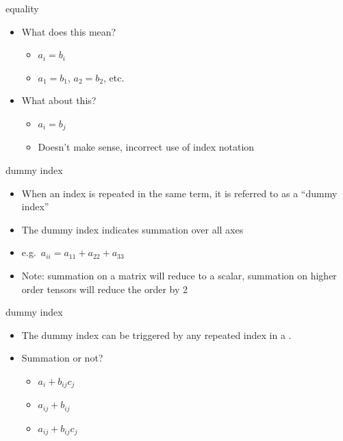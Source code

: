 \documentclass[
  letterpaper,
  ignorenonframetext,
  aspectratio=43,
  handout,
  12pt]{beamer}
\providecommand{\tightlist}{%
  \setlength{\itemsep}{0pt}\setlength{\parskip}{0pt}}
\providecommand{\tightlist}{%
\setlength{\itemsep}{0pt}\setlength{\parskip}{0pt}}
\begin{document}
\begin{frame}{equality}
\protect\hypertarget{equality}{}
\begin{itemize}
\tightlist
\item
  What does this mean?

  \begin{itemize}
  \item
    \(a_i = b_i\)
  \item
    \(a_1 = b_1\), \(a_2 = b_2\), etc.
  \end{itemize}
\item
  What about this?

  \begin{itemize}
  \item
    \(a_i = b_j\)
  \item
    Doesn't make sense, incorrect use of index notation
  \end{itemize}
\end{itemize}
\end{frame}

\begin{frame}{dummy index}
\protect\hypertarget{dummy-index}{}
\begin{itemize}
\tightlist
\item
  When an index is repeated in the same term, it is referred to as a
  ``dummy index''
\item
  The dummy index indicates summation over all axes
\item
  e.g.~\(a_{ii} = a_{11} + a_{22} + a_{33}\)
\item
  Note: summation on a matrix will reduce to a scalar, summation on
  higher order tensors will reduce the order by 2
\end{itemize}
\end{frame}

\begin{frame}{dummy index}
\protect\hypertarget{dummy-index-1}{}
\begin{itemize}
\tightlist
\item
  The dummy index can be triggered by any repeated index in a .
\item
  Summation or not?

  \begin{itemize}
  \tightlist
  \item
    \(a_i + b_{ij}c_j\)
  \item
    \(a_{ij} + b_{ij}\)
  \item
    \(a_{ij} + b_{ij}c_j\)
  \end{itemize}
\end{itemize}
\end{frame}
\end{document}
